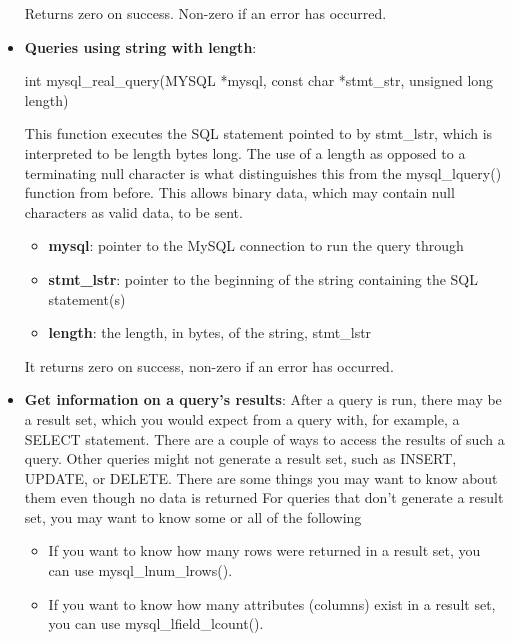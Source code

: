 \documentclass{report}
\begin{document}
\begin{itemize}
\begin{itemize}
            \end{itemize}
            \bigbreak \noindent 
            Returns zero on success. Non-zero if an error has occurred.
        \item \textbf{Queries using string with length}:
            \bigbreak \noindent 
            \begin{cppcode}
                int mysql_real_query(MYSQL *mysql,
                        const char *stmt_str,
                        unsigned long length)
            \end{cppcode}
            \bigbreak \noindent 
            This function executes the SQL statement pointed to by stmt\_lstr, which is interpreted to be length bytes long. The use of a length as opposed to a terminating null character is what distinguishes this from the mysql\_lquery() function from before. This allows binary data, which may contain null characters as valid data, to be sent.
            \begin{itemize}
                \item \textbf{mysql}: pointer to the MySQL connection to run the query through
                \item \textbf{stmt\_lstr}: pointer to the beginning of the string containing the SQL statement(s)
                \item \textbf{length}: the length, in bytes, of the string, stmt\_lstr
            \end{itemize}
            \bigbreak \noindent 
            It returns zero on success, non-zero if an error has occurred.
        \item \textbf{Get information on a query's results}:  After a query is run, there may be a result set, which you would expect from a query with, for example, a SELECT statement. There are a couple of ways to access the results of such a query.
            \bigbreak \noindent 
            Other queries might not generate a result set, such as INSERT, UPDATE, or DELETE. There are some things you may want to know about them even though no data is returned
            \bigbreak \noindent 
            For queries that don't generate a result set, you may want to know some or all of the following
            \begin{itemize}
                \item If you want to know how many rows were returned in a result set, you can use mysql\_lnum\_lrows().
                \item If you want to know how many attributes (columns) exist in a result set, you can use mysql\_lfield\_lcount().

\end{itemize}
\end{itemize}
\end{document}
